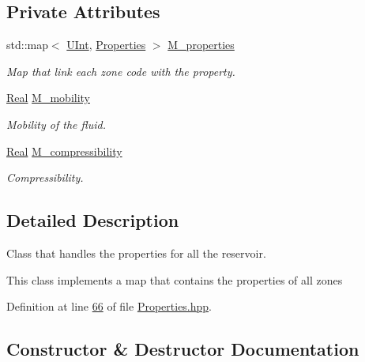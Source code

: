 \subsection*{Private Attributes}
\begin{DoxyCompactItemize}
\item 
std\+::map$<$ \hyperlink{namespaceFVCode3D_a4bf7e328c75d0fd504050d040ebe9eda}{U\+Int}, \hyperlink{classFVCode3D_1_1Properties}{Properties} $>$ \hyperlink{classFVCode3D_1_1PropertiesMap_afdef5e8ebad216c3799c6ab0eb3a2ab5}{M\+\_\+properties}
\begin{DoxyCompactList}\small\item\em Map that link each zone code with the property. \end{DoxyCompactList}\item 
\hyperlink{namespaceFVCode3D_a40c1f5588a248569d80aa5f867080e83}{Real} \hyperlink{classFVCode3D_1_1PropertiesMap_ad8c21900ff4a979050d999058595d65c}{M\+\_\+mobility}
\begin{DoxyCompactList}\small\item\em Mobility of the fluid. \end{DoxyCompactList}\item 
\hyperlink{namespaceFVCode3D_a40c1f5588a248569d80aa5f867080e83}{Real} \hyperlink{classFVCode3D_1_1PropertiesMap_a3c5225602e1555d998c454eb4e585022}{M\+\_\+compressibility}
\begin{DoxyCompactList}\small\item\em Compressibility. \end{DoxyCompactList}\end{DoxyCompactItemize}


\subsection{Detailed Description}
Class that handles the properties for all the reservoir. 

This class implements a map that contains the properties of all zones 

Definition at line \hyperlink{Properties_8hpp_source_l00066}{66} of file \hyperlink{Properties_8hpp_source}{Properties.\+hpp}.



\subsection{Constructor \& Destructor Documentation}
